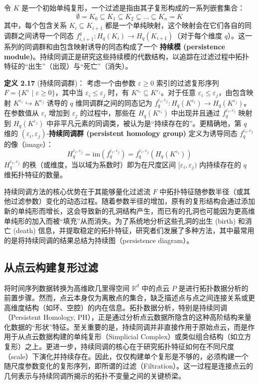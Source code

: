 令 $K$ 是一个初始单纯复形，一个过滤是指由其子复形构成的一系列嵌套集合：
$$ \emptyset = K_0 \subseteq K_1 \subseteq K_2 \subseteq \dots \subseteq K_n = K $$
其中，每个包含关系 $K_i \subseteq K_{i+1}$ 都是一个单纯映射，这个映射会在它们各自的同调群之间诱导一个同态 $f_{i, i+1}^q: H_q(K_i) \to H_q(K_{i+1})$（对于每个维度 $q$）。这一系列的同调群和由包含映射诱导的同态构成了一个 \textbf{持续模 (persistence module)}。持续同调正是研究这些持续模的代数结构，以追踪在过滤过程中拓扑特征的“出生”（出现）与“死亡”（消失）。

\textbf{定义 2.17} (持续同调群)：
考虑一个由参数 $\varepsilon \ge 0$ 索引的过滤复形序列 $F = \{K^\varepsilon \mid \varepsilon \ge 0\}$，其中当 $\varepsilon_i \le \varepsilon_j$ 时，有 $K^{\varepsilon_i} \subseteq K^{\varepsilon_j}$。对于任意 $\varepsilon_i \le \varepsilon_j$，由包含映射 $K^{\varepsilon_i} \hookrightarrow K^{\varepsilon_j}$ 诱导的 $q$ 维同调群之间的同态记为 $f_q^{\varepsilon_i, \varepsilon_j}: H_q(K^{\varepsilon_i}) \to H_q(K^{\varepsilon_j})$。
在参数值从 $\varepsilon_i$ 增加到 $\varepsilon_j$ 的过程中，那些在 $H_q(K^{\varepsilon_i})$ 中出现并且通过 $f_q^{\varepsilon_i, \varepsilon_j}$ 映射到 $H_q(K^{\varepsilon_j})$ 中非平凡元素的同调类，被认为是“持续存在的”。更精确地，第 $q$ 维的 $(\varepsilon_i, \varepsilon_j)$-\textbf{持续同调群 (persistent homology group)} 定义为诱导同态 $f_q^{\varepsilon_i, \varepsilon_j}$ 的像（image）：
$$ H_q^{\varepsilon_i, \varepsilon_j} = \text{im}(f_q^{\varepsilon_i, \varepsilon_j}) = f_q^{\varepsilon_i, \varepsilon_j}(H_q(K^{\varepsilon_i})) $$
$H_q^{\varepsilon_i, \varepsilon_j}$ 的秩（或维度，当以域为系数时）即为在尺度区间 $[\varepsilon_i, \varepsilon_j)$ 内持续存在的 $q$ 维拓扑特征的数量。

持续同调方法的核心优势在于其能够量化过滤流 $F$ 中拓扑特征随参数半径（或其他过滤参数）变化的动态过程。随着参数半径的增加，原有的复形结构会通过添加新的单纯形而增长，这会导致新的孔洞结构产生，而已有的孔洞也可能因为更高维单纯形的加入而被“填充”从而消失。为了系统地分析这些孔洞的出生 (birth) 和消亡 (death) 信息，并提取稳定的拓扑特征，研究者们发展了多种方法，其中最常用的是将持续同调的结果总结为持续图（persistence diagram）。

\subsection{从点云构建复形过滤}
将时间序列数据转换为高维欧几里得空间 $\mathbb{R}^d$ 中的点云 $P$ 是进行拓扑数据分析的前置步骤。然而，点云本身仅为离散点的集合，缺乏描述点与点之间连接关系或更高维度结构（如环、空腔）的内在信息。拓扑数据分析，特别是持续同调（Persistent Homology, PH），正是通过分析点云数据所隐含的这种高阶结构来量化数据的“形状”特征。至关重要的是，持续同调并非直接作用于原始点云，而是作用于从点云数据构建的单纯复形（Simplicial Complex）或类似组合结构（如立方复形）之上。更进一步，持续同调的核心在于研究拓扑特征如何在不同尺度（scale）下演化并持续存在。因此，仅仅构建单个复形是不够的，必须构建一个随尺度参数变化的复形序列，即所谓的过滤（Filtration）。这一过程是连接点云的几何表示与持续同调所揭示的拓扑不变量之间的关键桥梁。

